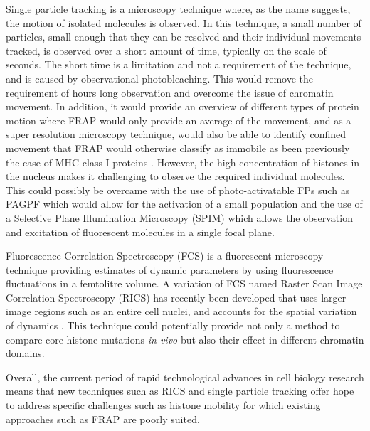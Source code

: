     Single particle tracking is a microscopy technique where, as the
    name suggests, the motion of isolated molecules is observed.  In
    this technique, a small number of particles, small enough that
    they can be resolved and their individual movements tracked, is
    observed over a short amount of time, typically on the scale of
    seconds.  The short time is a limitation and not a requirement of
    the technique, and is caused by observational photobleaching.
    This would remove the requirement of hours long observation and
    overcome the issue of chromatin movement.  In addition, it would
    provide an overview of different types of protein motion where
    FRAP would only provide an average of the movement, and as a super
    resolution microscopy technique, would also be able to identify
    confined movement that FRAP would otherwise classify as immobile
    as been previously the case of MHC class I proteins
    \citep{smith1999anomalous}.
    However, the high concentration of histones in the nucleus makes
    it challenging to observe the required individual molecules.  This
    could possibly be overcame with the use of photo-activatable FPs
    such as PAGPF which would allow for the activation of a small
    population and the use of a Selective Plane Illumination
    Microscopy (SPIM) which allows the observation and excitation of
    fluorescent molecules in a single focal plane.

    Fluorescence Correlation Spectroscopy (FCS) is a fluorescent
    microscopy technique providing estimates of dynamic parameters by
    using fluorescence fluctuations in a femtolitre volume.  A
    variation of FCS named Raster Scan Image Correlation Spectroscopy
    (RICS) has recently been developed that uses larger image regions
    such as an entire cell nuclei, and accounts for the spatial
    variation of dynamics \citep{digman2005rics}.  This technique
    could potentially provide not only a method to compare core
    histone mutations \textit{in vivo} but also their effect in
    different chromatin domains.

    Overall, the current period of rapid technological advances in
    cell biology research means that new techniques such as RICS and
    single particle tracking offer
    hope to address specific challenges such as histone mobility for
    which existing approaches such as FRAP are poorly suited.



